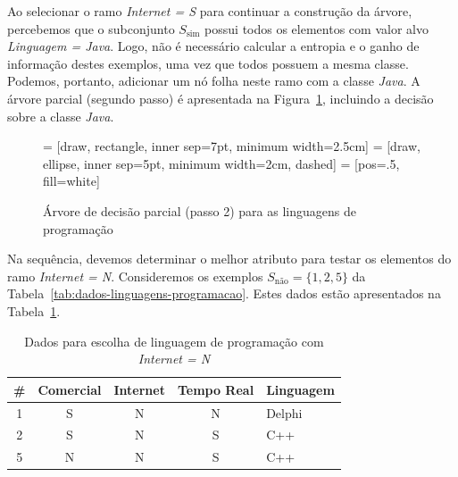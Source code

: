 Ao selecionar o ramo \textit{Internet = S} para continuar a construção da árvore, percebemos que o subconjunto $S_\text{sim}$ possui todos os elementos com valor alvo \textit{Linguagem = Java}. Logo, não é necessário calcular a entropia e o ganho de informação destes exemplos, uma vez que todos possuem a mesma classe. Podemos, portanto, adicionar um nó folha neste ramo com a classe \textit{Java}. A árvore parcial (segundo passo) é apresentada na Figura~\ref{fig:arvore-parcial-linguagens-programacao-2}, incluindo a decisão sobre a classe \textit{Java}.

\begin{figure}[h]
	\centering
	 = [draw, rectangle, inner sep=7pt, minimum width=2.5cm]
	 = [draw, ellipse, inner sep=5pt, minimum width=2cm, dashed]
	 = [pos=.5, fill=white]
	
	
	\caption{Árvore de decisão parcial (passo 2) para as linguagens de programação}
	\label{fig:arvore-parcial-linguagens-programacao-2}
\end{figure}

Na sequência, devemos determinar o melhor atributo para testar os elementos do ramo \textit{Internet = N}. Consideremos os exemplos $S_\text{não} = \{1, 2, 5\}$ da Tabela~\ref{tab:dados-linguagens-programacao}. Estes dados estão apresentados na Tabela~\ref{tab:dados-linguagens-programacao-internet-nao}.

\begin{table}[h]
	\centering
	
	\begin{tabular}{ccccl}
		\hline
		\textbf{\#} & \textbf{Comercial} & \textbf{Internet} & \textbf{Tempo Real} & \textbf{Linguagem} \\
		\hline
		1 & S & N & N & Delphi \\
		2 & S & N & S & C++ \\
		5 & N & N & S & C++ \\
		\hline
	\end{tabular}
	
	\caption{Dados para escolha de linguagem de programação com \textit{Internet = N}}
	\label{tab:dados-linguagens-programacao-internet-nao}
\end{table}

